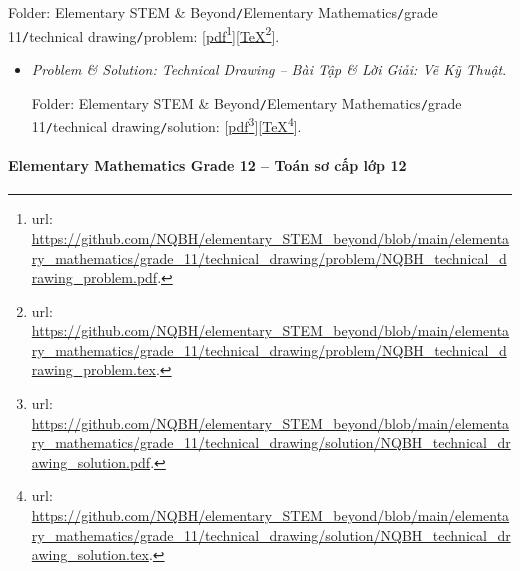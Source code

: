 \documentclass[12pt]{article}
\begin{document}
\begin{enumerate}
	Folder: {\sf Elementary STEM \& Beyond{\tt/}Elementary Mathematics{\tt/}grade 11{\tt/}technical drawing{\tt/}problem}: [\href{https://github.com/NQBH/elementary_STEM_beyond/blob/main/elementary_mathematics/grade_11/technical_drawing/problem/NQBH_technical_drawing_problem.pdf}{pdf}\footnote{{\sc url}: \url{https://github.com/NQBH/elementary_STEM_beyond/blob/main/elementary_mathematics/grade_11/technical_drawing/problem/NQBH_technical_drawing_problem.pdf}.}][\href{https://github.com/NQBH/elementary_STEM_beyond/blob/main/elementary_mathematics/grade_11/technical_drawing/problem/NQBH_technical_drawing_problem.tex}{\TeX}\footnote{{\sc url}: \url{https://github.com/NQBH/elementary_STEM_beyond/blob/main/elementary_mathematics/grade_11/technical_drawing/problem/NQBH_technical_drawing_problem.tex}.}].
	\begin{itemize}
		\item {\it Problem \& Solution: Technical Drawing -- Bài Tập \& Lời Giải: Vẽ Kỹ Thuật}.
		
		Folder: {\sf Elementary STEM \& Beyond{\tt/}Elementary Mathematics{\tt/}grade 11{\tt/}technical drawing{\tt/}solution}: [\href{https://github.com/NQBH/elementary_STEM_beyond/blob/main/elementary_mathematics/grade_11/technical_drawing/solution/NQBH_technical_drawing_solution.pdf}{pdf}\footnote{{\sc url}: \url{https://github.com/NQBH/elementary_STEM_beyond/blob/main/elementary_mathematics/grade_11/technical_drawing/solution/NQBH_technical_drawing_solution.pdf}.}][\href{https://github.com/NQBH/elementary_STEM_beyond/blob/main/elementary_mathematics/grade_11/technical_drawing/solution/NQBH_technical_drawing_solution.tex}{\TeX}\footnote{{\sc url}: \url{https://github.com/NQBH/elementary_STEM_beyond/blob/main/elementary_mathematics/grade_11/technical_drawing/solution/NQBH_technical_drawing_solution.tex}.}].
	\end{itemize}
\end{enumerate}

\paragraph{Elementary Mathematics Grade 12 -- Toán sơ cấp lớp 12}
\end{document}
